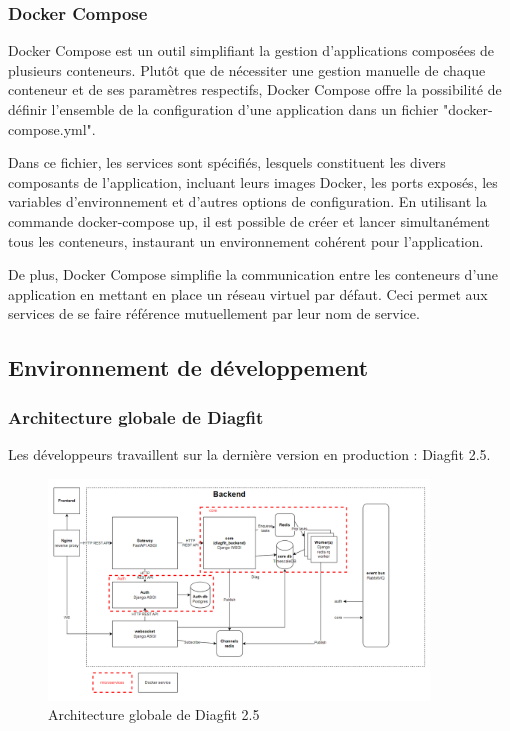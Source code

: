 \subsubsection{Docker Compose}
Docker Compose est un outil simplifiant la gestion d'applications composées de plusieurs conteneurs.
Plutôt que de nécessiter une gestion manuelle de chaque conteneur et de ses paramètres respectifs, Docker Compose offre la possibilité de définir l'ensemble de la configuration d'une application dans un fichier "docker-compose.yml".

Dans ce fichier, les services sont spécifiés, lesquels constituent les divers composants de l'application, incluant leurs images Docker, les ports exposés, les variables d'environnement et d'autres options de configuration.
En utilisant la commande docker-compose up, il est possible de créer et lancer simultanément tous les conteneurs, instaurant un environnement cohérent pour l'application.

De plus, Docker Compose simplifie la communication entre les conteneurs d'une application en mettant en place un réseau virtuel par défaut.
Ceci permet aux services de se faire référence mutuellement par leur nom de service.

\subsection{Environnement de développement}
\subsubsection{Architecture globale de Diagfit}
Les développeurs travaillent sur la dernière version en production : Diagfit 2.5.

\begin{figure}[ht!]
    \centering
    \includegraphics[width=0.9\textwidth]{paper/figures/archi2-5.png}
    \caption{Architecture globale de Diagfit 2.5}
    \label{fig:archi2-5}
\end{figure}

